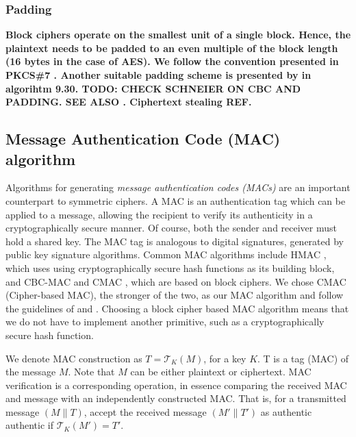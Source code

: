 
\subsubsection{Padding}

\textbf{Block ciphers operate on the smallest unit of a single block. Hence, the plaintext needs to be padded to an even multiple of the block length (16 bytes in the case of AES). We follow the convention presented in PKCS\#7 \cite{RFC-2315-kaliski-1998}. Another suitable padding scheme is presented by  in algorihtm 9.30. \textbf{TODO: CHECK SCHNEIER ON CBC AND PADDING.} \textbf{SEE ALSO \cite[Appendix A]{dworkin2001}.} \textbf{Ciphertext stealing REF. \cite{dworkin2010}}}

\subsection{Message Authentication Code (MAC) algorithm}

Algorithms for generating \textit{message authentication codes (MACs)} are an important counterpart to symmetric ciphers. A MAC is an authentication tag which can be applied to a message, allowing the recipient to verify its authenticity in a cryptographically secure manner. Of course, both the sender and receiver must hold a shared key. The MAC tag is analogous to digital signatures, generated by public key signature algorithms. Common MAC algorithms include HMAC , which uses using cryptographically secure hash functions as its building block, and CBC-MAC  and CMAC , which are based on block ciphers. We chose CMAC (Cipher-based MAC), the stronger of the two, as our MAC algorithm and follow the guidelines of  and . Choosing a block cipher based MAC algorithm means that we do not have to implement another primitive, such as a cryptographically secure hash function.

We denote MAC construction as $T=\mathcal{T}_K(M)$, for a key $K$. T is a tag (MAC) of the message $M$. Note that $M$ can be either plaintext or ciphertext.
MAC verification is a corresponding operation, in essence comparing the received MAC and message with an independently constructed MAC. That is, for a transmitted message $(M \parallel T)$, accept the received message $(M' \parallel T')$ as authentic authentic if $\mathcal{T}_K(M') = T'$.


